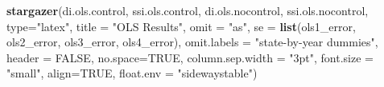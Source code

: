 \documentclass[
]{article}
\newenvironment{Shaded}{\begin{snugshade}}{\end{snugshade}}
\newcommand{\DataTypeTok}[1]{\textcolor[rgb]{0.13,0.29,0.53}{#1}}
\newcommand{\KeywordTok}[1]{\textcolor[rgb]{0.13,0.29,0.53}{\textbf{#1}}}
\newcommand{\NormalTok}[1]{#1}
\newcommand{\OtherTok}[1]{\textcolor[rgb]{0.56,0.35,0.01}{#1}}
\newcommand{\StringTok}[1]{\textcolor[rgb]{0.31,0.60,0.02}{#1}}
\begin{document}
\begin{Shaded}
\begin{Highlighting}[]
\KeywordTok{stargazer}\NormalTok{(di.ols.control, ssi.ols.control, di.ols.nocontrol, ssi.ols.nocontrol, }
          \DataTypeTok{type=}\StringTok{"latex"}\NormalTok{, }\DataTypeTok{title =} \StringTok{"OLS Results"}\NormalTok{, }\DataTypeTok{omit =} \StringTok{"as"}\NormalTok{, }
          \DataTypeTok{se =} \KeywordTok{list}\NormalTok{(ols1_error, ols2_error, ols3_error, ols4_error),}
          \DataTypeTok{omit.labels =} \StringTok{"state-by-year dummies"}\NormalTok{, }\DataTypeTok{header =} \OtherTok{FALSE}\NormalTok{, }\DataTypeTok{no.space=}\OtherTok{TRUE}\NormalTok{, }
          \DataTypeTok{column.sep.width =} \StringTok{"3pt"}\NormalTok{, }\DataTypeTok{font.size =} \StringTok{"small"}\NormalTok{, }\DataTypeTok{align=}\OtherTok{TRUE}\NormalTok{, }
          \DataTypeTok{float.env =} \StringTok{"sidewaystable"}\NormalTok{)}
\end{Highlighting}
\end{Shaded}
\end{document}
